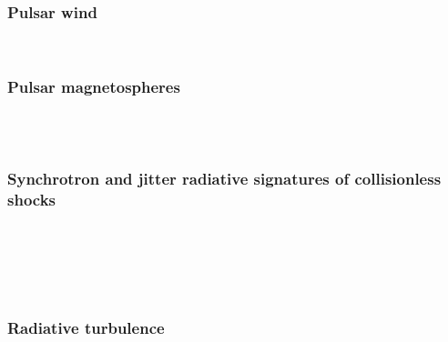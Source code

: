 \documentclass[usenatbib,twocolumn]{aastex63}
\begin{document}
\subsubsection{Pulsar wind}
\citep{Cerutti_2017} \\

\subsubsection{Pulsar magnetospheres}
\citep{Cerutti_2016a} \\
\citep{Philippov_2018} \\


\subsubsection{Synchrotron and jitter radiative signatures of collisionless shocks}
\citep{Medvedev_2009} \\
\citep{Sironi_2009} \\
\citep{Kirk_2010} \\
\citep{Nishikawa_2011} \\

\subsubsection{Radiative turbulence}
\citep{Zhdankin_2019}











\end{document}
